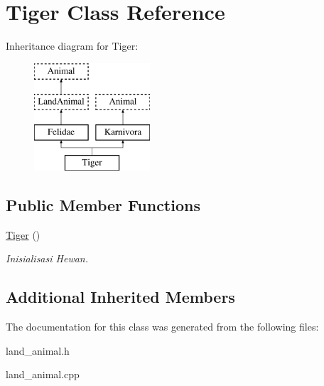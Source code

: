 \hypertarget{class_tiger}{}\section{Tiger Class Reference}
\label{class_tiger}
Inheritance diagram for Tiger\+:\begin{figure}[H]
\begin{center}
\leavevmode
\includegraphics[height=4.000000cm]{class_tiger}
\end{center}
\end{figure}
\subsection*{Public Member Functions}
\begin{DoxyCompactItemize}
\item 
\hyperlink{class_tiger_ab2b455a0cdbd21f2052eef2a176f0eeb}{Tiger} ()\hypertarget{class_tiger_ab2b455a0cdbd21f2052eef2a176f0eeb}{}\label{class_tiger_ab2b455a0cdbd21f2052eef2a176f0eeb}

\begin{DoxyCompactList}\small\item\em Inisialisasi Hewan. \end{DoxyCompactList}\end{DoxyCompactItemize}
\subsection*{Additional Inherited Members}


The documentation for this class was generated from the following files\+:\begin{DoxyCompactItemize}
\item 
land\+\_\+animal.\+h\item 
land\+\_\+animal.\+cpp\end{DoxyCompactItemize}
